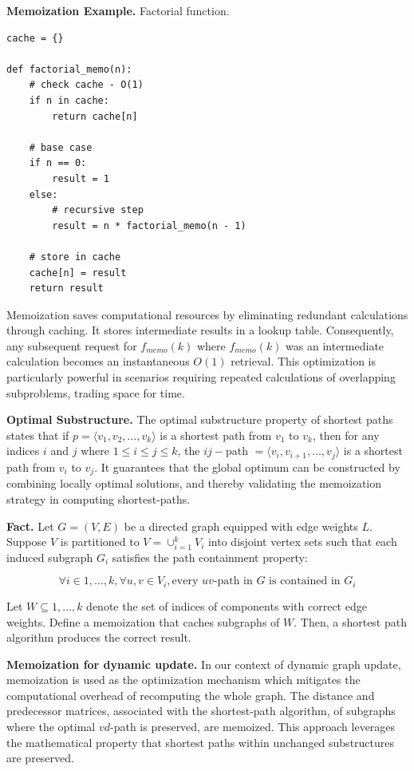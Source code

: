 \documentclass[pdflatex,sn-mathphys-num]{sn-jnl}%
\begin{document}
\textbf{Memoization Example.} Factorial function.
\begin{verbatim}
cache = {}

def factorial_memo(n):
    # check cache - O(1)
    if n in cache:
        return cache[n]
    
    # base case
    if n == 0:
        result = 1
    else:
        # recursive step
        result = n * factorial_memo(n - 1)
    
    # store in cache
    cache[n] = result
    return result
\end{verbatim}

Memoization saves computational resources by eliminating redundant calculations through caching. It stores intermediate results in a lookup table. Consequently, any subsequent request for $f_{memo}(k)$ where $f_{memo}(k)$ was an intermediate calculation becomes an instantaneous $O(1)$ retrieval. This optimization is particularly powerful in scenarios requiring repeated calculations of overlapping subproblems, trading space for time.

\textbf{Optimal Substructure.} The optimal substructure property of shortest paths states that if $p = \langle v_1, v_2, \dots, v_k \rangle$ is a shortest path from $v_1$ to $v_k$, then for any indices $i$ and $j$ where $1 \le i \le j \le k$, the $ij-$path $= \langle v_i, v_{i+1}, \dots, v_j \rangle$ is a shortest path from $v_i$ to $v_j$. It guarantees that the global optimum can be constructed by combining locally optimal solutions, and thereby validating the memoization strategy in computing shortest-paths.

\textbf{Fact.} Let $G = (V,E)$ be a directed graph equipped with edge weights $L$. Suppose $V$ is partitioned to $V = \cup_{i=1}^k V_i$ into disjoint vertex sets such that each induced subgraph $G_i$ satisfies the path containment property:

$$
\forall i \in {1,\dots,k}, \forall u,v \in V_i, \text{every $uv$-path in $G$ is contained in $G_i$}
$$

Let $W \subseteq {1, \dots, k}$ denote the set of indices of components with correct edge weights. Define a memoization that caches subgraphs of $W$. Then, a shortest path algorithm produces the correct result.

\textbf{Memoization for dynamic update.} In our context of dynamic graph update, memoization is used as the optimization mechanism which mitigates the computational overhead of recomputing the whole graph. The distance and predecessor matrices, associated with the shortest-path algorithm, of subgraphs where the optimal $vd$-path is preserved, are memoized. This approach leverages the mathematical property that shortest paths within unchanged substructures are preserved.
\end{document}
